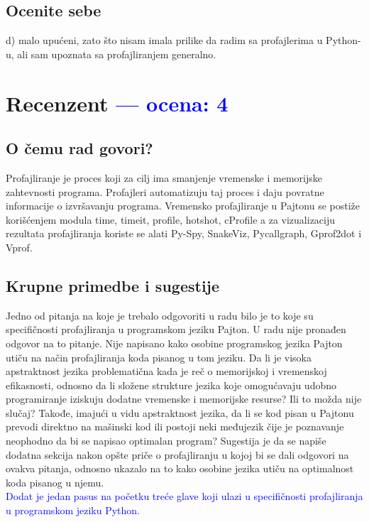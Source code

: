 \documentclass[a4paper]{report}
\newcommand{\odgovor}[1]{\textcolor{blue}{#1}}
\begin{document}
\section{Ocenite sebe}
d) malo upućeni, zato što nisam imala prilike da radim sa profajlerima u Python-u, ali sam upoznata sa profajliranjem generalno.

\chapter{Recenzent \odgovor{--- ocena: 4} }


\section{O čemu rad govori?}
Profajliranje je proces koji za cilj ima smanjenje vremenske i memorijske zahtevnosti programa. Profajleri automatizuju taj proces i daju povratne informacije o izvršavanju programa. Vremensko profajliranje u Pajtonu se postiže korišćenjem modula time, timeit, profile, hotshot, cProfile a za vizualizaciju rezultata profajliranja koriste se alati Py-Spy, SnakeViz, Pycallgraph, Gprof2dot i Vprof.




\section{Krupne primedbe i sugestije}
Jedno od pitanja na koje je trebalo odgovoriti u radu bilo je to koje su specifičnosti profajliranja u programskom jeziku Pajton. U radu nije pronađen odgovor na to pitanje. Nije napisano kako osobine programskog jezika Pajton utiču na način profajliranja koda pisanog u tom jeziku. Da li je visoka apstraktnost jezika problematična kada je reč o memorijskoj i vremenskoj efikasnosti, odnosno da li složene strukture jezika koje omogućavaju udobno programiranje iziskuju dodatne vremenske i memorijske resurse? Ili to možda nije slučaj? Takođe, imajući u vidu apstraktnost jezika, da li se kod pisan u Pajtonu prevodi direktno na mašinski kod ili postoji neki međujezik čije je poznavanje neophodno da bi se napisao optimalan program? Sugestija je da se napiše dodatna sekcija nakon opšte priče o profajliranju u kojoj bi se dali odgovori na ovakva pitanja, odnosno ukazalo na to kako osobine jezika utiču na optimalnost koda pisanog u njemu.\\
\odgovor{Dodat je jedan pasus na početku treće glave koji ulazi u specifičnosti profajliranja u programskom jeziku Python.}
\end{document}
